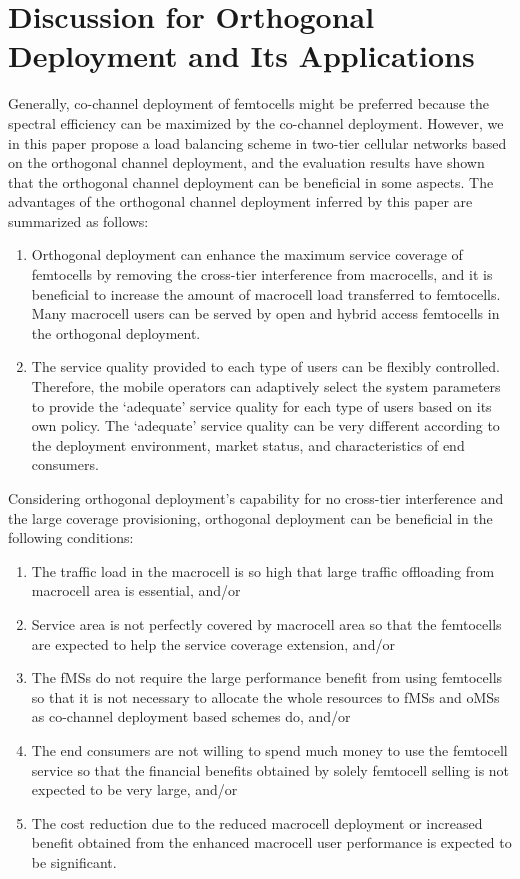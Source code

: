 \documentclass[journal]{IEEEtran}
\begin{document}
\section{Discussion for Orthogonal Deployment and Its Applications}
\label{sec:orthogonal}

Generally, co-channel deployment of femtocells might be preferred because the
spectral efficiency can be maximized by the co-channel deployment.
However, we in this paper propose a load balancing scheme in
two-tier cellular networks based on the orthogonal channel deployment,
and the evaluation results have shown that
the orthogonal channel deployment can be beneficial in some aspects.
The advantages of the orthogonal
channel deployment inferred by this paper are summarized as follows:
\begin{enumerate}
\item Orthogonal deployment can enhance the maximum service coverage of femtocells by removing the cross-tier interference from macrocells, and it is beneficial to increase the amount of macrocell load transferred to femtocells. Many macrocell users can be served by open and hybrid access femtocells in the orthogonal deployment.
\item The service quality provided to each type of users can be flexibly controlled. Therefore, the mobile operators can adaptively select the system parameters to provide the `adequate' service quality for each type of users based on its own policy. The `adequate' service quality can be very different according to the deployment environment, market status, and characteristics of end consumers.
\end{enumerate}
Considering orthogonal deployment's capability for no cross-tier interference and
the large coverage provisioning, orthogonal deployment can be beneficial in the following conditions:	
\begin{enumerate}
\item The traffic load in the macrocell is so high that large traffic offloading from macrocell area is essential, and/or
\item Service area is not perfectly covered by macrocell area so that the femtocells are expected to help the service coverage extension, and/or
\item The fMSs do not require the large performance benefit from using femtocells so that it is not necessary to allocate the whole resources to fMSs and oMSs as co-channel deployment based schemes do, and/or
\item The end consumers are not willing to spend much money to use the femtocell service so that the financial benefits obtained by solely femtocell selling is not expected to be very large, and/or
\item The cost reduction due to the reduced macrocell deployment or increased benefit obtained from the enhanced macrocell user performance is expected to be significant.
\end{enumerate}





\ifCLASSOPTIONcaptionsoff
  \newpage
\fi
\end{document}
